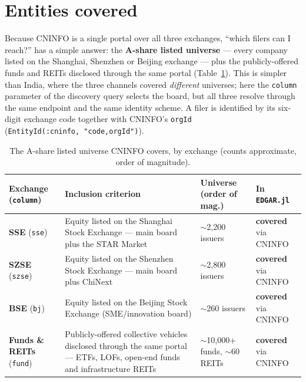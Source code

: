 \documentclass[11pt,a4paper]{report}
\begin{document}
\section{Entities covered}\label{sec:china-entities}

Because CNINFO is a single portal over all three exchanges, ``which filers can I reach?'' has a simple answer:
the \textbf{A-share listed universe} --- every company listed on the Shanghai, Shenzhen or Beijing exchange ---
plus the publicly-offered funds and REITs disclosed through the same portal (Table~\ref{tab:china-entities}). This is simpler than India, where the three channels covered
\emph{different} universes; here the \texttt{column} parameter of the discovery query selects the board, but
all three resolve through the same endpoint and the same identity scheme. A filer is identified by its
six-digit exchange code together with CNINFO's \texttt{orgId} (\texttt{EntityId(:cninfo,\ "code,orgId")}).

\begin{table}[h]
\centering
\small
\caption{The A-share listed universe CNINFO covers, by exchange (counts approximate, order of magnitude).}
\label{tab:china-entities}
\begin{tabular}{@{}p{}p{}p{}p{}@{}}
\toprule
\textbf{Exchange (\texttt{column})} & \textbf{Inclusion criterion} & \textbf{Universe (order of mag.)} & \textbf{In \texttt{EDGAR.jl}} \\
\midrule
\textbf{SSE} (\texttt{sse}) & Equity listed on the Shanghai Stock Exchange --- main board plus the STAR Market & $\sim$2{,}200 issuers & \textbf{covered} via CNINFO \\
\textbf{SZSE} (\texttt{szse}) & Equity listed on the Shenzhen Stock Exchange --- main board plus ChiNext & $\sim$2{,}800 issuers & \textbf{covered} via CNINFO \\
\textbf{BSE} (\texttt{bj}) & Equity listed on the Beijing Stock Exchange (SME/innovation board) & $\sim$260 issuers & \textbf{covered} via CNINFO \\
\textbf{Funds \& REITs} (\texttt{fund}) & Publicly-offered collective vehicles disclosed through the same portal --- ETFs, LOFs, open-end funds and infrastructure REITs & $\sim$10{,}000+ funds, $\sim$60 REITs & \textbf{covered} via CNINFO \\
\bottomrule
\end{tabular}
\end{table}
\end{document}
